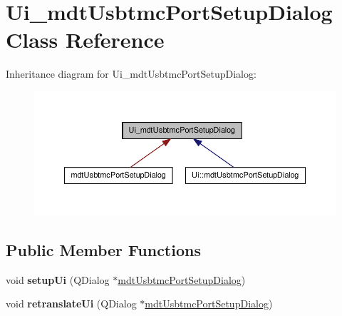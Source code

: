 \hypertarget{class_ui__mdt_usbtmc_port_setup_dialog}{
\section{Ui\_\-mdtUsbtmcPortSetupDialog Class Reference}
\label{class_ui__mdt_usbtmc_port_setup_dialog}
}


Inheritance diagram for Ui\_\-mdtUsbtmcPortSetupDialog:
\nopagebreak
\begin{figure}[H]
\begin{center}
\leavevmode
\includegraphics[width=390pt]{class_ui__mdt_usbtmc_port_setup_dialog__inherit__graph}
\end{center}
\end{figure}
\subsection*{Public Member Functions}
\begin{DoxyCompactItemize}
\item 
\hypertarget{class_ui__mdt_usbtmc_port_setup_dialog_aa61ed93896240e1c04bac11c92f80382}{
void {\bfseries setupUi} (QDialog $\ast$\hyperlink{classmdt_usbtmc_port_setup_dialog}{mdtUsbtmcPortSetupDialog})}
\label{class_ui__mdt_usbtmc_port_setup_dialog_aa61ed93896240e1c04bac11c92f80382}

\item 
\hypertarget{class_ui__mdt_usbtmc_port_setup_dialog_a93532a398b7f50171b5f162e3dd954fb}{
void {\bfseries retranslateUi} (QDialog $\ast$\hyperlink{classmdt_usbtmc_port_setup_dialog}{mdtUsbtmcPortSetupDialog})}
\label{class_ui__mdt_usbtmc_port_setup_dialog_a93532a398b7f50171b5f162e3dd954fb}

\end{DoxyCompactItemize}
